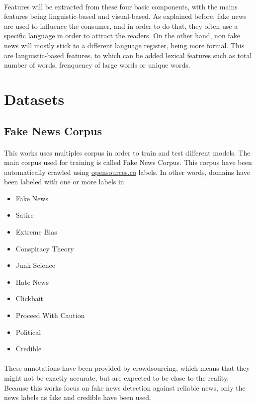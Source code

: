 \paragraph{} Features will be extracted from these four basic components, with the mains features being linguistic-based and visual-based. 
As explained before, fake news are used to influence the consumer, and in order to do that, they often use a specific language in order to attract the readers. On the other hand, non fake news will mostly stick to a different language register, being more formal. This are languistic-based features, to which can be added lexical features such as total number of words, frenquency of large words or unique words. 

\section{Datasets}
\subsection{Fake News Corpus}
\paragraph{}
This works uses multiples corpus in order to train and test different models. The main corpus used for training is called Fake News Corpus\cite{Szpakowski}. This corpus have been automatically crawled using \url{opensources.co} labels. In other words, domains have been labeled with one or more labels in \begin{itemize}
	\item Fake News
	\item Satire
	\item Extreme Bias
	\item Conspiracy Theory
	\item Junk Science
	\item Hate News
	\item Clickbait
	\item Proceed With Caution
	\item Political
	\item Credible
\end{itemize}
\paragraph{}
These annotations have been provided by crowdsourcing, which means that they might not be exactly accurate, but are expected to be close to the reality. Because this works focus on fake news detection against reliable news, only the news labels as fake and credible have been used. 

